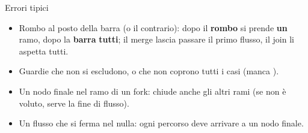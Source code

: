 \begin{attenzione}{Errori tipici}
\begin{itemize}[nosep, leftmargin=*]
  \item Rombo al posto della barra (o il contrario): dopo il \textbf{rombo} si prende \textbf{un} ramo, dopo la
        \textbf{barra} \textbf{tutti}; il merge lascia passare il primo flusso, il join li aspetta tutti.
  \item Guardie che non si escludono, o che non coprono tutti i casi (manca \code{[else]}).
  \item Un nodo finale nel ramo di un fork: chiude anche gli altri rami (se non è voluto, serve la fine di flusso).
  \item Un flusso che si ferma nel nulla: ogni percorso deve arrivare a un nodo finale.
\end{itemize}
\end{attenzione}
